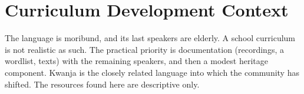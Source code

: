 \documentclass[12pt]{article}
\begin{document}
\section{Curriculum Development Context}
The language is moribund, and its last speakers are elderly. A school curriculum is not realistic as such. The practical priority is documentation (recordings, a wordlist, texts) with the remaining speakers, and then a modest heritage component. Kwanja is the closely related language into which the community has shifted. The resources found here are descriptive only.
\end{document}
